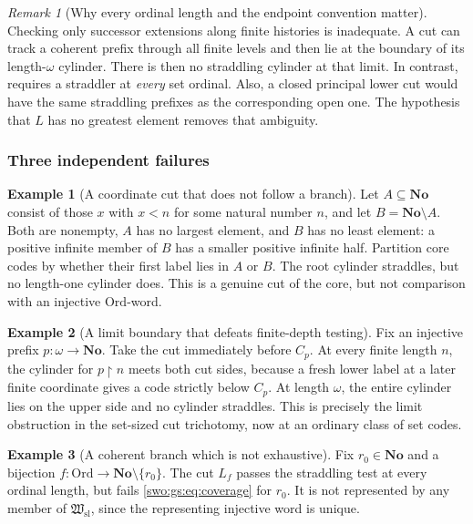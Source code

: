 \documentclass[11pt]{article}
\theoremstyle{definition}
\newtheorem{example}[example]{Example}
\theoremstyle{remark}
\newtheorem{remark}[remark]{Remark}
\newcommand{\No}{\mathbf{No}}
\newcommand{\Ord}{\mathrm{Ord}}
\newcommand{\Hsl}{\mathfrak W_{\mathrm{sl}}}
\newcommand{\res}{\mathbin{\upharpoonright}}
\begin{document}
\begin{remark}[Why every ordinal length and the endpoint convention matter]\label{swo:gs:n9.2}
Checking only successor extensions along finite histories is inadequate.
A cut can track a coherent prefix through all finite levels and then lie
at the boundary of its length-$\omega$ cylinder. There is then no
straddling cylinder at that limit. In contrast,
 requires a straddler at \emph{every} set
ordinal. Also, a closed principal lower cut would have the same
straddling prefixes as the corresponding open one. The hypothesis that
$L$ has no greatest element removes that ambiguity.
\end{remark}

\subsubsection{Three independent failures}
\begin{example}[A coordinate cut that does not follow a branch]\label{swo:gs:n9.3}
Let $A\subseteq\No$ consist of those $x$ with $x<n$ for some natural
number $n$, and let $B=\No\setminus A$. Both are nonempty, $A$ has no
largest element, and $B$ has no least element: a positive infinite member
of $B$ has a smaller positive infinite half. Partition core codes by
whether their first label lies in $A$ or $B$. The root cylinder straddles,
but no length-one cylinder does. This is a genuine cut of the core, but
not comparison with an injective $\Ord$-word.
\end{example}

\begin{example}[A limit boundary that defeats finite-depth testing]\label{swo:gs:n9.4}
Fix an injective prefix $p:\omega\to\No$. Take the cut immediately
before $C_p$. At every finite length $n$, the cylinder for
$p\res n$ meets both cut sides, because a fresh lower label at a later
finite coordinate gives a code strictly below $C_p$. At length
$\omega$, the entire cylinder lies on the upper side and no cylinder
straddles. This is precisely the limit obstruction in the set-sized cut
trichotomy, now at an ordinary class of set codes.
\end{example}

\begin{example}[A coherent branch which is not exhaustive]\label{swo:gs:n9.5}
Fix $r_0\in\No$ and a bijection $f:\Ord\to\No\setminus\{r_0\}$.
The cut $L_f$ passes the straddling test at every ordinal length, but fails
\eqref{swo:gs:eq:coverage} for $r_0$. It is not represented by any member of
$\Hsl$, since the representing injective word is unique.
\end{example}
\end{document}
